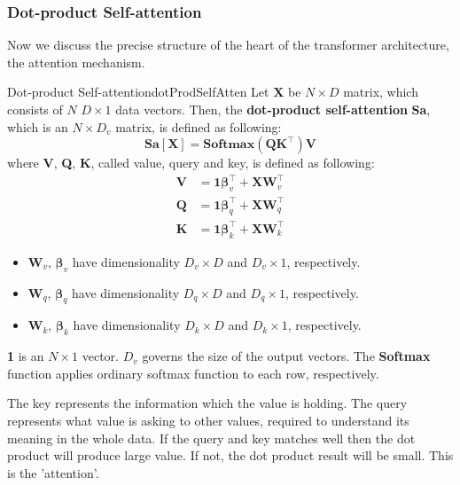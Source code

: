 \documentclass{article}
\begin{document}
        \subsubsection{Dot-product Self-attention}
            Now we discuss the precise structure of the heart of the transformer architecture, the attention mechanism.

            \begin{defn}{Dot-product Self-attention}{dotProdSelfAtten}
                Let $\textbf{X}$ be $N \times D$ matrix, which consists of $N$ $D \times 1$ data vectors.
                Then, the \textbf{dot-product self-attention} \textbf{Sa}, which is an $N \times D_v$ matrix, is defined as following:
                \[
                \textbf{Sa}[\textbf{X}]=\textbf{Softmax}\left( \textbf{Q}\textbf{K}^{\top}\right)\textbf{V}
                \]
                where \textbf{V}, \textbf{Q}, \textbf{K}, called value, query and key, is defined as following:
                \begin{align*}
                    \textbf{V} &= \textbf{1}\bm{\beta}_v^{\top} + \textbf{X}\textbf{W}_v^{\top} \\
                    \textbf{Q} &= \textbf{1}\bm{\beta}_q^{\top} + \textbf{X}\textbf{W}_q^{\top} \\
                    \textbf{K} &= \textbf{1}\bm{\beta}_k^{\top} + \textbf{X}\textbf{W}_k^{\top}
                \end{align*}
                
                \begin{itemize}
                    \item $\textbf{W}_v$, $\bm{\beta}_v$ have dimensionality $D_v \times D$ and $D_v \times 1$, respectively.
                    \item $\textbf{W}_q$, $\bm{\beta}_q$ have dimensionality $D_q \times D$ and $D_q \times 1$, respectively.
                    \item $\textbf{W}_k$, $\bm{\beta}_k$ have dimensionality $D_k \times D$ and $D_k \times 1$, respectively.
                \end{itemize}
                
                \textbf{1} is an $N \times 1$ vector. 
                $D_v$ governs the size of the output vectors.
                The \textbf{Softmax} function applies ordinary softmax function to each row, respectively.
            \end{defn}
            The key represents the information which the value is holding.
            The query represents what value is asking to other values, required to understand its meaning in the whole data.
            If the query and key matches well then the dot product will produce large value.
            If not, the dot product result will be small. This is the 'attention'.
\end{document}
